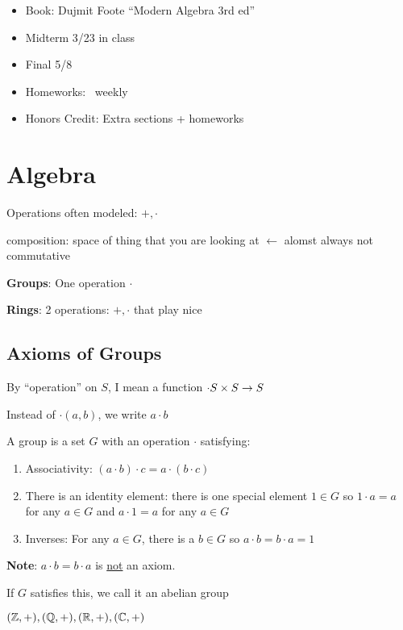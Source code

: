
\begin{itemize}
  \item Book: Dujmit Foote ``Modern Algebra 3rd ed''
  \item Midterm 3/23 in class
  \item Final 5/8
  \item Homeworks: ~weekly
  \item Honors Credit: Extra sections + homeworks
\end{itemize}


\chapter{Algebra}
Operations often modeled:
$+, \cdot$

composition: space of thing that you are looking at $\leftarrow$ alomst always not commutative

\textbf{Groups}: One operation $\cdot$

\textbf{Rings}: 2 operations: $+, \cdot$ that play nice


\section{Axioms of Groups}

By ``operation'' on $S$, I mean a function $\cdot S \times S \rightarrow S$

Instead of $\cdot(a, b)$, we write $a \cdot b$

A group is a set $G$ with an operation $\cdot$ satisfying:
\begin{enumerate}
  \item Associativity: $(a \cdot b) \cdot c = a \cdot (b \cdot c)$
  \item There is an identity element: there is one special element $1 \in G$ so $1 \cdot a  = a$ for any $a \in G$
  and $a \cdot 1 = a$ for any $a \in G$
  \item Inverses: For any $a \in G$, there is a $b \in G$ so $a \cdot b = b \cdot a = 1$

\end{enumerate}

\textbf{Note}: $a \cdot b = b\cdot a$ is \underline{not} an axiom.

If $G$ satisfies this, we call it an abelian group

\begin{example}
  $(\mathbb Z, +), (\mathbb Q, +), (\mathbb R, +), (\mathbb C, +)$
\end{example}

